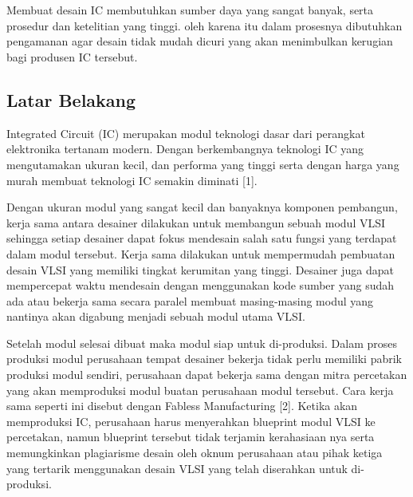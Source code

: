 % 

\chapter{\babSatu}
Membuat desain IC membutuhkan sumber daya yang sangat banyak, serta prosedur dan ketelitian yang tinggi. oleh karena itu dalam prosesnya dibutuhkan pengamanan agar desain tidak mudah dicuri yang akan menimbulkan kerugian bagi produsen IC tersebut.

% 

\section{Latar Belakang}
Integrated Circuit (IC) merupakan modul teknologi dasar dari perangkat elektronika tertanam modern. Dengan berkembangnya teknologi IC yang mengutamakan ukuran kecil, dan performa yang tinggi serta dengan harga yang murah membuat teknologi IC semakin diminati [1].

Dengan ukuran modul yang sangat kecil dan banyaknya komponen pembangun, kerja sama antara desainer dilakukan untuk membangun sebuah modul VLSI sehingga setiap desainer dapat fokus mendesain salah satu fungsi yang terdapat dalam modul tersebut. Kerja sama dilakukan untuk mempermudah pembuatan desain VLSI yang memiliki tingkat kerumitan yang tinggi. Desainer juga dapat mempercepat waktu mendesain dengan menggunakan kode sumber yang sudah ada atau bekerja sama secara paralel membuat masing-masing modul yang nantinya akan digabung menjadi sebuah modul utama VLSI.

Setelah modul selesai dibuat maka modul siap untuk di-produksi. Dalam proses produksi modul perusahaan tempat desainer bekerja tidak perlu memiliki pabrik produksi modul sendiri, perusahaan dapat bekerja sama dengan mitra percetakan yang akan memproduksi modul buatan perusahaan modul tersebut. Cara kerja sama seperti ini disebut dengan Fabless Manufacturing [2]. Ketika akan memproduksi IC, perusahaan harus menyerahkan blueprint modul VLSI ke percetakan, namun blueprint tersebut tidak terjamin kerahasiaan nya serta memungkinkan plagiarisme desain oleh oknum perusahaan atau pihak ketiga yang tertarik menggunakan desain VLSI yang telah diserahkan untuk di-produksi.

